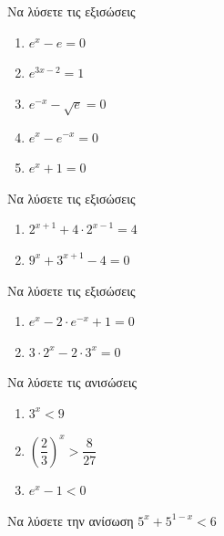 \documentclass{presentation}
\begin{document}
\begin{askisi}

  Να λύσετε τις εξισώσεις
  \begin{enumerate}
    \item<1-> $e^x-e=0$
    \item<2-> $e^{3x-2}=1$
    \item<3-> $e^{-x}-\sqrt{e}=0$
    \item<4-> $e^x-e^{-x}=0$
    \item<5-> $e^x+1=0$
  \end{enumerate}


\end{askisi}

\begin{askisi}
  Να λύσετε τις εξισώσεις
  \begin{enumerate}
    \item<1-> $2^{x+1}+4\cdot 2^{x-1}=4$
    \item<2-> $9^x+3^{x+1}-4=0$
  \end{enumerate}


\end{askisi}

\begin{askisi}
  Να λύσετε τις εξισώσεις
  \begin{enumerate}
    \item<1-> $e^x-2\cdot e^{-x}+1=0$
    \item<2-> $3\cdot 2^x-2\cdot 3^x=0$
  \end{enumerate}


\end{askisi}

\begin{askisi}
  Να λύσετε τις ανισώσεις
  \begin{enumerate}
    \item<1-> $3^x<9$
    \item<2-> $\left( \dfrac{2}{3} \right)^x > \dfrac{8}{27} $
    \item<3-> $e^x-1<0$
  \end{enumerate}


\end{askisi}

\begin{askisi}
  Να λύσετε την ανίσωση $5^x+5^{1-x}<6$


\end{askisi}
\end{document}
